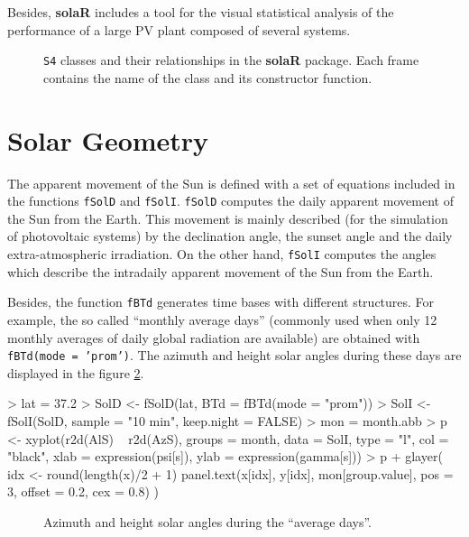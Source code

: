 \documentclass[a4paper]{article}
\renewenvironment{Schunk}{\vspace{\topsep}}{\vspace{\topsep}}
\newcommand{\code}[1]{{\texttt{#1}}}
\newcommand{\pkg}[1]{{\textbf{#1}}}
\begin{document}
Besides, \pkg{solaR} includes a tool for the visual statistical analysis of
the performance of a large PV plant composed of several systems.



\begin{figure}
  \centering
  \caption{\code{S4} classes and their relationships in the \pkg{solaR} package. Each frame contains the name of the class and its constructor function.}
  \label{fig:classes}
\end{figure}



\section{Solar Geometry}
\label{sec:solar_geometry}
The apparent movement of the Sun is defined with a set of equations
included in the functions \code{fSolD} and
\code{fSolI}. \code{fSolD} computes the daily apparent movement of
the Sun from the Earth. This movement is mainly described (for the
simulation of photovoltaic systems) by the declination angle, the
sunset angle and the daily extra-atmospheric irradiation.  On the
other hand, \code{fSolI} computes the angles which describe the
intradaily apparent movement of the Sun from the Earth.

Besides, the function \code{fBTd} generates time bases with
different structures. For example, the so called
``monthly average days'' (commonly used when only 12 monthly averages
of daily global radiation are available) are obtained with
\code{fBTd(mode = 'prom')}. The azimuth and height solar angles during
these days are displayed in the figure \ref{fig:AzimutAltura}.

\begin{Schunk}
\begin{Sinput}
> lat = 37.2
> SolD <- fSolD(lat, BTd = fBTd(mode = "prom"))
> SolI <- fSolI(SolD, sample = "10 min", keep.night = FALSE)
> mon = month.abb
> p <- xyplot(r2d(AlS) ~ r2d(AzS), groups = month, data = SolI, 
     type = "l", col = "black", 
     xlab = expression(psi[s]), 
     ylab = expression(gamma[s]))
> p + glayer({
     idx <- round(length(x)/2 + 1)
     panel.text(x[idx], y[idx], mon[group.value], pos = 3, offset = 0.2, 
         cex = 0.8)
 })
\end{Sinput}
\end{Schunk}

\begin{figure}
\begin{centering}
\par\end{centering}
\caption{\label{fig:AzimutAltura}Azimuth and height solar angles during the ``average days''.}
\end{figure}
\end{document}
